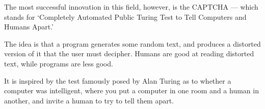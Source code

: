 	The most successful innovation in this field, however, is the CAPTCHA —
	which stands for ‘Completely Automated Public Turing Test to Tell Computers
	and Humans Apart.’

	The idea is that a program generates some random text,
	and produces a distorted version of it that the user must decipher. Humans
	are good at reading distorted text, while programs are less good. 

	It is inspired by the test famously posed by Alan Turing as to whether a computer
	was intelligent, where you put a computer in one room and a human in
	another, and invite a human to try to tell them apart. 

